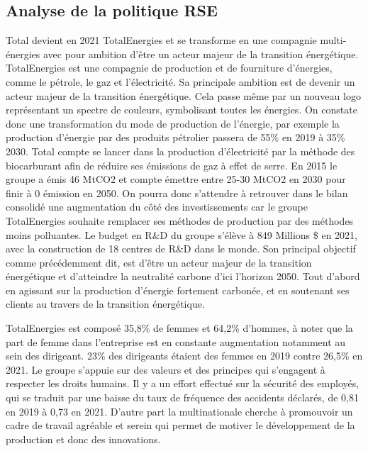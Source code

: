 \documentclass[12pt]{article}
\begin{document}
\subsection{Analyse de la politique RSE}
Total devient en 2021 TotalEnergies et se transforme en une compagnie multi-énergies avec pour ambition d'être 
un acteur majeur de la transition énergétique. TotalEnergies est une compagnie de production et de fourniture
d'énergies, comme le pétrole, le gaz et l'électricité. Sa principale ambition est de devenir un acteur majeur 
de la transition énergétique. Cela passe même par un nouveau logo représentant un spectre de couleurs,
symbolisant toutes les énergies. On constate donc une transformation du mode de production de l'énergie, par 
exemple la production d'énergie par des produits pétrolier passera de 55\% en 2019 à  35\% 2030. Total compte 
se lancer dans la production d'électricité par la méthode des biocarburant afin de réduire ses émissions de 
gaz à effet de serre. En 2015 le groupe a émis 46 MtCO2 et compte émettre entre 25-30 MtCO2 en 2030 pour finir 
à 0 émission en 2050. On pourra donc s'attendre à retrouver dans le bilan consolidé une augmentation du côté 
des investissements car le groupe TotalEnergies souhaite remplacer ses méthodes de production par des méthodes 
moins polluantes. 
Le budget en R\&D du groupe s'élève à 849 Millions \$ en 2021, avec la construction de 18 centres de R\&D dans 
le monde. Son principal objectif comme précédemment dit, est d'être un acteur majeur de la transition 
énergétique et d'atteindre la neutralité carbone d'ici l'horizon 2050. Tout d'abord en agissant sur la 
production d'énergie fortement carbonée, et en soutenant ses clients au travers de la transition énergétique.

TotalEnergies est composé 35,8\% de femmes et 64,2\% d'hommes, à noter que la part de femme dans l'entreprise 
est en constante augmentation notamment au sein des dirigeant. 23\% des dirigeants étaient des femmes en 2019 
contre 26,5\% en 2021. Le groupe s'appuie sur des valeurs et des principes qui s'engagent à respecter les droits humains. Il y a un effort effectué sur la sécurité des employés, qui se traduit par une 
baisse du taux de fréquence des accidents déclarés, de 0,81 en 2019 à 0,73 en 2021.
D'autre part la multinationale cherche à promouvoir un cadre de travail agréable et serein qui permet de 
motiver le développement de la production et donc des innovations. 
\end{document}
